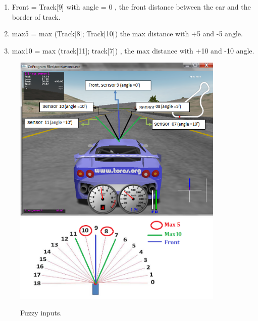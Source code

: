 \documentclass{llncs}
\begin{document}
\begin{enumerate}
	\item Front = Track[9]  with angle = 0 , the front distance between the car and the border of track.
	\item max5 = max (Track[8]; Track[10])
	the max distance with +5 and  -5 angle.
	\item max10 = max (track[11]; track[7]) ,	the max distance with +10 and  -10 angle.
\end{enumerate}
\begin{figure}[h!]
	
	\centering
	\includegraphics[width=0.9\textwidth]{fig/sensor22.PNG}
	\includegraphics[width=0.9\textwidth]{fig/front.PNG}
	\begin{minipage}{10cm}
		\centering
		\caption{\footnotesize Fuzzy inputs.}
		\label{fig34}
	\end{minipage} 		
\end{figure}
\newpage
\end{document}

